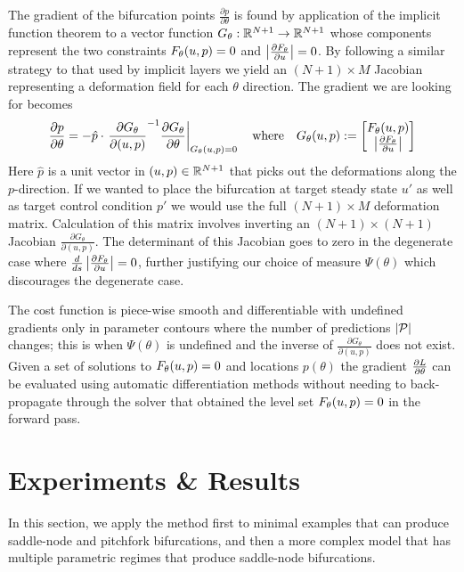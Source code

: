 The gradient of the bifurcation points $\frac{\partial p}{\partial\theta}$ is found by application of the implicit function theorem to a vector function $G_{\theta}:\mathbb{R}^{N+1}\rightarrow\mathbb{R}^{N+1}$ whose components represent the two constraints $F_{\theta}(u,p)=0$ and $\left| \frac{\partial F_{\theta}}{\partial u} \right|=0$. By following a similar strategy to that used by implicit layers \cite{Look2020DifferentiableLayers} we yield an $(N+1)\times M$ Jacobian representing a deformation field \cite{Jos2011OnSurface} for each $\theta$ direction. The gradient we are looking for becomes
\begin{align}
    \frac{\partial p}{\partial\theta} = -\hat{p}\cdot\left.\frac{\partial G_{\theta}}{\partial (u,p)}^{-1}
    \frac{\partial  G_{\theta}}{\partial\theta}\right|_{G_{\theta}(u,p)=0}
    \quad\mathrm{where}\quad
    G_{\theta}(u,p):=\begin{bmatrix}F_{\theta}(u,p)\\\left| \frac{\partial F_{\theta}}{\partial u} \right|\end{bmatrix}
    \label{eq:gradient-bifurcation}
\end{align}
Here $\hat{p}$ is a unit vector in $(u,p)\in\mathbb{R}^{N+1}$ that picks out the deformations along the $p$-direction. If we wanted to place the bifurcation at target steady state $u'$ as well as target control condition $p'$ we would use the full $(N+1)\times M$ deformation matrix. Calculation of this matrix involves inverting an $(N+1)\times(N+1)$ Jacobian $\frac{\partial G_{\theta}}{\partial(u,p)}$. The determinant of this Jacobian goes to zero in the degenerate case where $\frac{d}{ds}\left| \frac{\partial F_{\theta}}{\partial u} \right|=0$, further justifying our choice of measure $\Psi(\theta)$ which discourages the degenerate case.

The cost function is piece-wise smooth and differentiable with undefined gradients only in parameter contours where the number of predictions $|\mathcal{P}|$ changes; this is when $\Psi(\theta)$ is undefined and the inverse of $\frac{\partial G_{\theta}}{\partial (u,p)}$ does not exist. Given a set of solutions to $F_{\theta}(u,p)=0$ and locations $p(\theta)$ the gradient $\frac{\partial L}{\partial\theta}$ can be evaluated using automatic differentiation methods \cite{Revels2016Forward-ModeJulia,Flux} without needing to back-propagate through the solver that obtained the level set $F_{\theta}(u,p)=0$ in the forward pass.


\section{Experiments \& Results}
In this section, we apply the method first to minimal examples that can produce saddle-node and pitchfork bifurcations, and then a more complex model that has multiple parametric regimes that produce saddle-node bifurcations.


